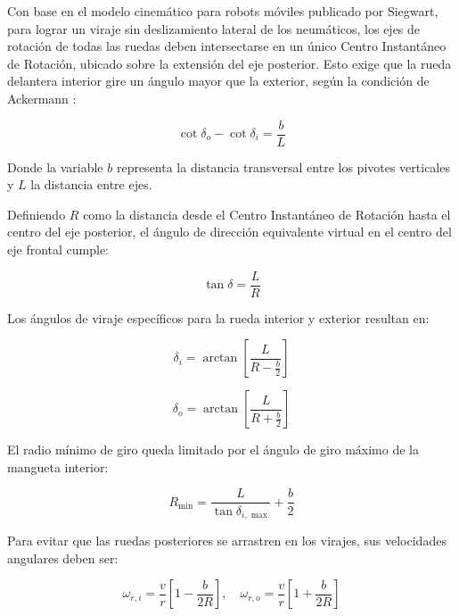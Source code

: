 \documentclass[../../General.tex]{subfiles}
\begin{document}
Con base en el modelo cinemático para robots móviles publicado por Siegwart, para lograr un viraje sin deslizamiento lateral de los neumáticos, los ejes de rotación de todas las ruedas deben intersectarse en un único Centro Instantáneo de Rotación, ubicado sobre la extensión del eje posterior. Esto exige que la rueda delantera interior gire un ángulo mayor que la exterior, según la condición de Ackermann \citep{siegwart2004mobile, jazar2017vehicle}:

\begin{equation*}
    \cot \delta_o - \cot \delta_i = \frac{b}{L}
\end{equation*}

Donde la variable $b$ representa la distancia transversal entre los pivotes verticales y $L$ la distancia entre ejes.

Definiendo $R$ como la distancia desde el Centro Instantáneo de Rotación hasta el centro del eje posterior, el ángulo de dirección equivalente virtual en el centro del eje frontal cumple:

\begin{equation*}
    \tan \delta = \frac{L}{R}
\end{equation*}

Los ángulos de viraje específicos para la rueda interior y exterior resultan en:

\begin{equation*}
    \delta_i = \arctan \left[ \frac{L}{R - \frac{b}{2}} \right]
\end{equation*}

\begin{equation*}
    \delta_o = \arctan \left[ \frac{L}{R + \frac{b}{2}} \right]
\end{equation*}

El radio mínimo de giro queda limitado por el ángulo de giro máximo de la mangueta interior:

\begin{equation*}
    R_{\min} = \frac{L}{\tan \delta_{i,\max}} + \frac{b}{2}
\end{equation*}

Para evitar que las ruedas posteriores se arrastren en los virajes, sus velocidades angulares deben ser:

\begin{equation*}
    \omega_{r,i} = \frac{v}{r} \left[ 1 - \frac{b}{2R} \right], \quad \omega_{r,o} = \frac{v}{r} \left[ 1 + \frac{b}{2R} \right]
\end{equation*}
\end{document}
